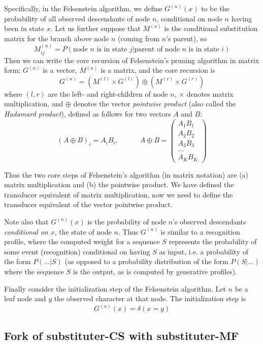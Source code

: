 \documentclass{article}
\newcommand{\seclabel}[1]{\label{sec.#1}}
\begin{document}
Specifically, in the Felsenstein algorithm,
we define $G^{(n)}(x)$ to be the probability of all observed descendants of node $n$,
conditional on node $n$ having been in state $x$.
Let us further suppose that $M^{(n)}$ is the conditional substitution matrix
for the branch above node $n$ (coming from $n$'s parent), so
\[
M^{(n)}_{ij}=P(\mbox{node $n$ is in state $j$}|\mbox{parent of node $n$ is in state $i$})
\]
Then we can write the core recursion of Felsenstein's pruning algorithm in matrix form;
$G^{(n)}$ is a vector, $M^{(n)}$ is a matrix, and the core recursion is
\[
G^{(n)} = \left( M^{(l)} \times G^{(l)} \right) \oplus \left( M^{(r)} \times G^{(r)} \right)
\]
where $(l,r)$ are the left- and right-children of node $n$,
$\times$ denotes matrix multiplication,
and $\oplus$ denotes the vector {\em pointwise product} (also called the {\em Hadamard product}),
defined as follows for two vectors $A$ and $B$:
\[
(A \oplus B)_i = A_i B_i,
\quad \quad \quad
A \oplus B = \left( \begin{array}{c}
A_1 B_1 \\ A_2 B_2 \\ A_3 B_3 \\ \ldots \\ A_K B_K
\end{array} \right)
\]

Thus the two core steps of Felsenstein's algorithm (in matrix notation)
are (a) matrix multiplication and (b) the pointwise product.
We have defined the transducer equivalent of matrix multiplication,
now we need to define the transducer equivalent of the vector pointwise product.

Note also that $G^{(n)}(x)$ is the probability of node $n$'s observed descendants
{\em conditional on} $x$, the state of node $n$.
Thus $G^{(n)}$ is similar to a recognition profile,
where the computed weight for a sequence $S$ represents
the probability of some event (recognition) conditional on having $S$ as input,
i.e. a probability of the form $P(\ldots|S)$
(as opposed to a probability distribution of the form $P(S|\ldots)$ where the sequence $S$ is the output,
as is computed by generative profiles).

Finally consider the initialization step of the Felsenstein algorithm.
Let $n$ be a leaf node and $y$ the observed character at that node.
The initialization step is
\[
G^{(n)}(x) = \delta(x=y)
\]

\subsection{Fork of substituter-CS with substituter-MF}
\seclabel{fork-subcs-submf}
\end{document}
